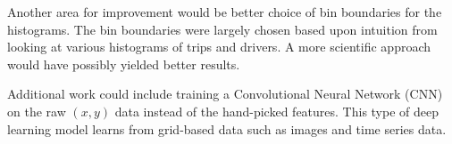 \documentclass[a4paper, 11pt, twocolumn]{report}
\begin{document}
Another area for improvement would be better choice of bin boundaries for the histograms. The bin boundaries were largely chosen based upon intuition from looking at various histograms of trips and drivers. A more scientific approach would have possibly yielded better results.

Additional work could include training a Convolutional Neural Network (CNN) on the raw $(x,y)$ data instead of the hand-picked features. This type of deep learning model learns from grid-based data such as images and time series data.


\printbibliography
\end{document}
